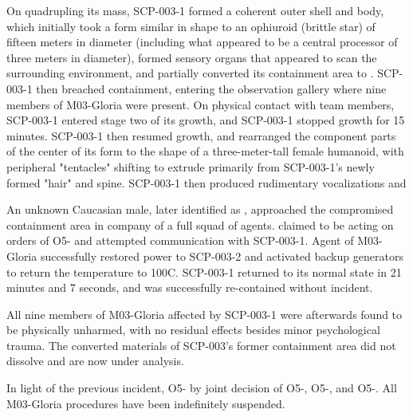 On quadrupling its mass, SCP-003-1 formed a coherent outer shell and body, which initially took a form similar in shape to an ophiuroid (brittle star) of fifteen meters in diameter (including what appeared to be a central processor of three meters in diameter), formed sensory organs that appeared to scan the surrounding environment, and partially converted its containment area to \redacted. SCP-003-1 then breached containment, entering the observation gallery where nine members of M03-Gloria were present. On physical contact with team members, SCP-003-1 entered stage two of its growth, and \expunged SCP-003-1 stopped growth for 15 minutes. SCP-003-1 then resumed growth, and rearranged the component parts of the center of its form to the shape of a three-meter-tall female humanoid, with peripheral "tentacles" shifting to extrude primarily from SCP-003-1's newly formed "hair" and spine. SCP-003-1 then produced rudimentary vocalizations and \expunged

An unknown Caucasian male, later identified as \redacted, approached the compromised containment area in company of a full squad of agents. \redacted claimed to be acting on orders of O5- and attempted communication with SCP-003-1. \expunged Agent  of M03-Gloria successfully restored power to SCP-003-2 and activated backup generators to return the temperature to 100\degree C. SCP-003-1 returned to its normal state in 21 minutes and 7 seconds, and was successfully re-contained without incident.

All nine members of M03-Gloria affected by SCP-003-1 were afterwards found to be physically unharmed, with no residual effects besides minor psychological trauma. The converted materials of SCP-003's former containment area did not dissolve and are now under analysis.

 In light of the previous incident, O5- \expunged by joint decision of O5-, O5-, and O5-. All M03-Gloria procedures have been indefinitely suspended.
